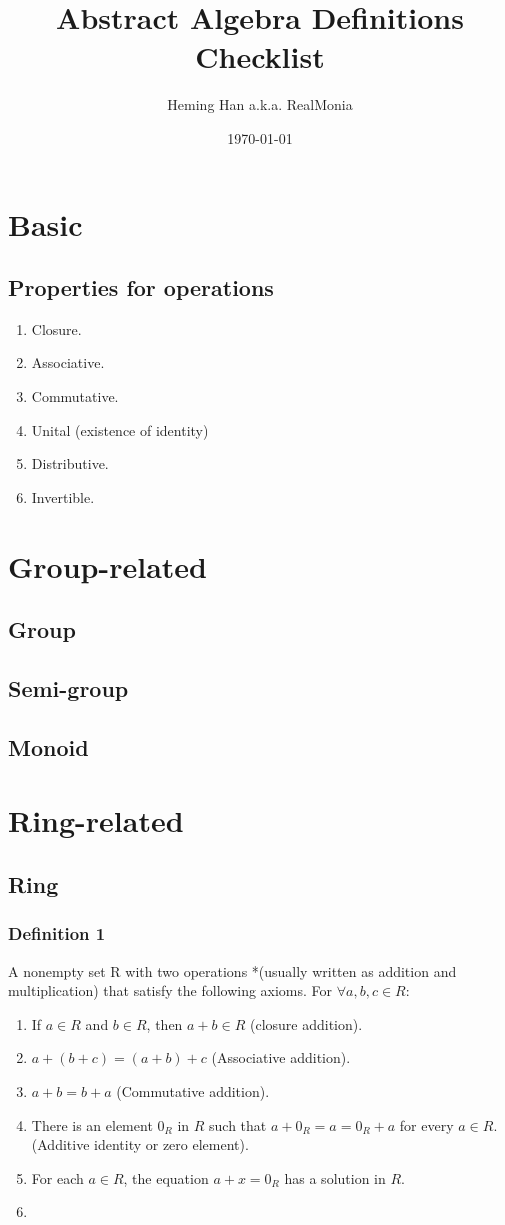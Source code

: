 \documentclass[letter]{article}
\author{Heming Han a.k.a. RealMonia}
\title{\bf Abstract Algebra Definitions Checklist}
\date{\today}
\begin{document}
\maketitle
\section{Basic}
\subsection{Properties for operations}
\begin{enumerate}
    \item Closure.
    \item Associative.
    \item Commutative.
    \item Unital (existence of identity)
    \item Distributive.
    \item Invertible.
\end{enumerate}
\section{Group-related}
\subsection{Group}
\subsection{Semi-group}
\subsection{Monoid}
\section{Ring-related}
\subsection{Ring}
\subsubsection{Definition 1}
A nonempty set R with two operations *(usually written as addition and multiplication) that satisfy the
following axioms. For $\forall a,b,c\in R$:\\
\begin{enumerate}
	\item If $a\in R$ and $b\in R$, then $a+b\in R$ (closure addition).
	\item $a+(b+c)=(a+b)+c$ (Associative addition).
	\item $a+b=b+a$ (Commutative addition).
	\item There is an element $0_R$ in $R$ such that $a+0_R=a=0_R+a$ for every $a\in R$. (Additive identity or zero element).
	\item For each $a\in R$, the equation $a+x=0_R$ has a solution in $R$.
	\item
\end{enumerate}
\end{document}
